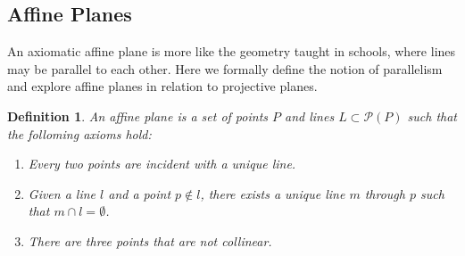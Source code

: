 \documentclass{article}
\newtheorem{definition}{Definition}
\newcommand{\PG}{\mathrm{PG}}
\begin{document}


\subsection{Affine Planes}

An axiomatic affine plane is more like the geometry taught in schools, where lines may be parallel to each other. Here we formally define the notion of parallelism and explore affine planes in relation to projective planes.

\begin{definition}

  An affine plane is a set of points \(P\) and lines \(L \subset \mathcal{P}(P)\) such that the folloming axioms hold:

  \begin{enumerate}
    \item Every two points are incident with a unique line.~\label{axiom:aff-1}
    \item Given a line \(l\) and a point \(p \notin l\), there exists a unique line \(m\) through \(p\) such that \(m \cap l = \emptyset\).~\label{axiom:aff-2}
    \item There are three points that are not collinear.~\label{axiom:aff-3}
  \end{enumerate}
\end{definition}
\end{document}
